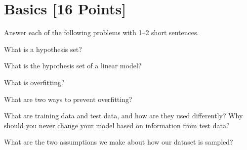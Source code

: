 
\newpage
\section{Basics [16 Points]}

Answer each of the following problems with 1--2 short sentences.

\begin{problem}[2]
What is a hypothesis set?
\end{problem}
\begin{solution}

\end{solution}

\begin{problem}[2]
What is the hypothesis set of a linear model?
\end{problem}
\begin{solution}

\end{solution}

\begin{problem}[2]
What is overfitting?
\end{problem}
\begin{solution}

\end{solution}

\begin{problem}[2]
What are two ways to prevent overfitting?
\end{problem}
\begin{solution}

\end{solution}

\begin{problem}[2]
What are training data and test data, and how are they used differently?
Why should you never change your model based on information from test data?
\end{problem}
\begin{solution}

\end{solution}

\begin{problem}[2]
What are the two assumptions we make about how our dataset is sampled?
\end{problem}
\begin{solution}

\end{solution}

